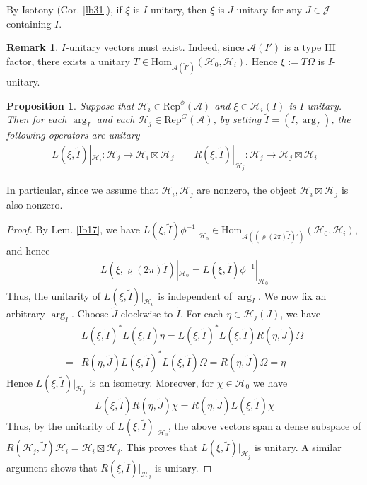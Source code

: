 \documentclass[11pt,b5paper,notitlepage]{article}
\theoremstyle{definition}
\newtheorem{rem}[df]{Remark}
\theoremstyle{plain}
\newtheorem{pp}[df]{Proposition}
\newcommand{\wtd}{\widetilde}
\newcommand{\ovl}{\overline}
\newcommand{\Hom}{\mathrm{Hom}}
\newcommand{\Rep}{\mathrm{Rep}}
\newcommand{\RepGA}{\mathrm{Rep}^G(\mathcal A)}
\newcommand{\MA}{\mathcal A}
\newcommand{\MH}{\mathcal H}
\newcommand{\MJ}{\mathcal J}
\numberwithin{equation}{section}
\begin{document}
By Isotony (Cor. \ref{lb31}), if $\xi$ is $I$-unitary, then $\xi$ is $J$-unitary for any $J\in\MJ$ containing $I$.


\begin{rem}
$I$-unitary vectors must exist. Indeed, since $\MA(I')$ is a type III factor, there exists a unitary $T\in\Hom_{\MA(\wtd I')}(\MH_0,\MH_i)$. Hence $\xi:=T\Omega$ is $I$-unitary. 
\end{rem}


\begin{pp}\label{lb33}
Suppose that $\MH_i\in\Rep^\phi(\MA)$ and $\xi\in\MH_i(I)$ is $I$-unitary. Then for each $\arg_I$ and each $\MH_j\in\RepGA$, by setting $\wtd I=(I,\arg_I)$, the following operators are unitary
\begin{align*}
L(\xi,\wtd I)|_{\MH_j}:\MH_j\rightarrow\MH_i\boxtimes\MH_j\qquad R(\xi,\wtd I)|_{\MH_j}:\MH_j\rightarrow\MH_j\boxtimes\MH_i
\end{align*}
\end{pp}

In particular, since we assume that $\MH_i,\MH_j$ are nonzero, the object $\MH_i\boxtimes\MH_j$ is also nonzero.

\begin{proof}
By Lem. \ref{lb17}, we have $L(\xi,\wtd I)\phi^{-1}|_{\MH_0}\in\Hom_{\MA((\varrho(2\pi)\wtd I)')}(\MH_0,\MH_i)$, and hence
\begin{align}
L(\xi,\varrho(2\pi)\wtd I)|_{\MH_0}=L(\xi,\wtd I)\phi^{-1}|_{\MH_0}
\end{align}
Thus, the unitarity of $L(\xi,\wtd I)|_{\MH_0}$ is independent of $\arg_I$. We now fix an arbitrary $\arg_I$. Choose $\wtd J$ clockwise to $\wtd I$. For each $\eta\in\MH_j(J)$, we have
\begin{align*}
&L(\xi,\wtd I)^*L(\xi,\wtd I)\eta=L(\xi,\wtd I)^*L(\xi,\wtd I)R(\eta,\wtd J)\Omega\\
=&R(\eta,\wtd J)L(\xi,\wtd I)^*L(\xi,\wtd I)\Omega=R(\eta,\wtd J)\Omega=\eta
\end{align*}
Hence $L(\xi,\wtd I)|_{\MH_j}$ is an isometry. Moreover, for $\chi\in\MH_0$ we have
\begin{align*}
L(\xi,\wtd I)R(\eta,\wtd J)\chi=R(\eta,\wtd J)L(\xi,\wtd I)\chi
\end{align*}
Thus, by the unitarity of $L(\xi,\wtd I)|_{\MH_0}$, the above vectors span a dense subspace of $\ovl{R(\MH_j,\wtd J)\MH_i}=\MH_i\boxtimes\MH_j$. This proves that $L(\xi,\wtd I)|_{\MH_j}$ is unitary. A similar argument shows that $R(\xi,\wtd I)|_{\MH_j}$ is unitary.
\end{proof}
\end{document}
